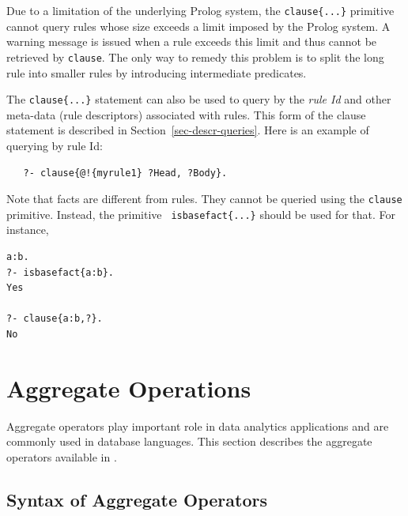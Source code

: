 \documentclass[11pt]{article}
\newcommand{\ERGO}{\mbox{\smaller{\ensuremath{\cal{E}}\smaller{{\sc{RGO}}}}}\xspace}
\newcommand{\FLSYSTEM}{\ERGO}
\begin{document}
Due to a limitation of the underlying Prolog system, the {\tt clause\{...\}}
primitive cannot query rules whose size exceeds a limit imposed by the
Prolog system.  A warning message is issued when a rule exceeds this limit
and thus cannot be retrieved by {\tt clause}.  The only way to remedy this
problem is to split the long rule into smaller rules by introducing
intermediate predicates.

The {\tt clause\{...\}} statement can also be used to query by the \emph{rule Id} and
other meta-data (rule descriptors)
associated with \FLSYSTEM rules. This form of the clause
statement is described in Section~\ref{sec-descr-queries}.
Here is an example of querying by rule Id:
\begin{verbatim}
   ?- clause{@!{myrule1} ?Head, ?Body}.
\end{verbatim}

Note that \FLSYSTEM facts are different from rules. They cannot be queried
using the {\tt clause} primitive. Instead, the primitive {\tt
  isbasefact\{...\}} should be used for that. For instance,
\begin{verbatim}
a:b.
?- isbasefact{a:b}.
Yes

?- clause{a:b,?}.
No
\end{verbatim}






\section{Aggregate Operations}
\label{sec-aggregates}

Aggregate operators play important role in data analytics applications and
are commonly used in database languages. This section describes the
aggregate operators available in \FLSYSTEM.

\subsection{Syntax of Aggregate Operators}
\end{document}
